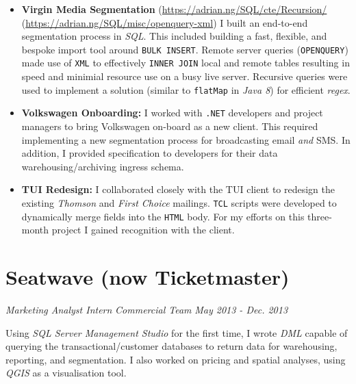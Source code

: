 \documentclass[letterpaper,11pt]{article}
\begin{document}
\begin{itemize}
	\item
	      {
	      \textbf{Virgin Media Segmentation}
	      \hfill
	      \tiny
	      (\href{https://adrian.ng/SQL/cte/Recursion/}{https://adrian.ng/SQL/cte/Recursion/}
	      \quad
	      (\href{https://adrian.ng/SQL/misc/openquery-xml}{https://adrian.ng/SQL/misc/openquery-xml})
	      \newline
	      \small
	      I built an end-to-end segmentation process in \textit{SQL}. This included building a fast, flexible, and bespoke import tool around \texttt{BULK INSERT}. Remote server queries (\texttt{OPENQUERY}) made use of \texttt{XML} to effectively \texttt{INNER JOIN} local and remote tables resulting in speed and minimial resource use on a busy live server. Recursive queries were used to implement a solution (similar to \texttt{flatMap} in \textit{Java 8}) for efficient \textit{regex}.
	      }
	\item
	      {
	      \textbf{Volkswagen Onboarding:}
	      I worked with \texttt{.NET} developers and project managers to bring Volkswagen on-board as a new client. This required implementing a new segmentation process for broadcasting email \textit{and} SMS. In addition, I provided specification to developers for their data warehousing/archiving ingress schema.
	      }
	\item
	      {
	      \textbf{TUI Redesign:}
	      I collaborated closely with the TUI client to redesign the existing \textit{Thomson} and \textit{First Choice} mailings. \texttt{TCL} scripts were developed to dynamically merge fields into the \texttt{HTML} body.  For my efforts on this three-month project I gained recognition with the client.
	      }
\end{itemize}
\section{Seatwave (now Ticketmaster)}
\textit{Marketing Analyst Intern}
\hfill
\textit{Commercial Team}
\hfill
\textit{May 2013 - Dec. 2013\\}

\noindent
Using \textit{SQL Server Management Studio} for the first time, I wrote \textit{DML} capable of querying the transactional/customer databases to return data for warehousing, reporting, and segmentation. I also worked on pricing and spatial analyses, using \textit{QGIS} as a visualisation tool.
\end{document}
